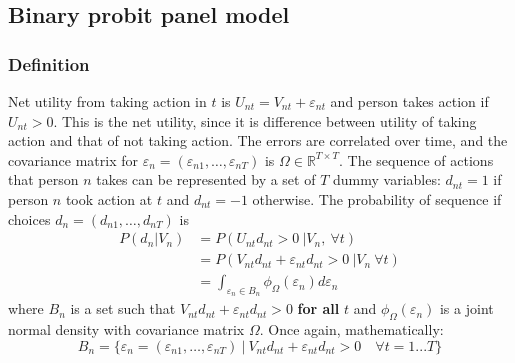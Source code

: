 \documentclass[11pt,a4paper]{article}
\begin{document}
\subsection*{Binary probit panel model}
\subsubsection*{Definition}
Net utility from taking action in $ t $ is
$ U_{nt} = V_{nt} + \varepsilon_{nt} $ and person takes action
if $ U_{nt}> 0 $. This is the net utility, since it is difference
between utility of taking action and that of not taking action.
The errors are correlated over time, and the covariance matrix
for $ \varepsilon_{n} = (\varepsilon_{n1}, \dots, \varepsilon_{nT}) $
is $ \Omega\in\mathbb{R}^{T\times T} $. The sequence of actions
that person $ n $ takes can be represented by a set of $ T $ dummy
variables: $ d_{nt} = 1 $ if person $ n $ took action at $ t $ and
$ d_{nt} = -1 $ otherwise. The probability of sequence if choices
$ d_n = (d_{n1}, \dots, d_{nT}) $ is
\begin{align*}
    P(d_n| V_n) & = P(U_{nt}d_{nt}>0~|V_n,~ \forall t)                        \\
                & = P(V_{nt}d_{nt} + \varepsilon_{nt}d_{nt} > 0 ~|V_n~\forall
    t)                                                                        \\
                & = \int_{\varepsilon_n \in B_n} \phi_{\Omega}(\varepsilon_n)
    d\varepsilon_n
\end{align*}
where $ B_n $ is a set such that $ V_{nt}d_{nt} + \varepsilon_{nt}d_{nt} > 0 $
\textbf{for all} $ t $ and $ \phi_{\Omega}(\varepsilon_n)  $ is a joint
normal density with covariance matrix $ \Omega $. Once again,
mathematically:
$$ B_n = \{ \varepsilon_n = (\varepsilon_{n1}, \dots, \varepsilon_{nT})
    ~|~V_{nt}d_{nt} + \varepsilon_{nt}d_{nt} > 0 \quad \forall t = 1...T\} $$
\end{document}
